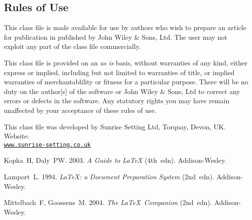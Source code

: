 \documentclass[times]{stvrauth}
\begin{document}
\subsection{Rules of Use}
This class file is made available for use by authors who wish to
prepare an article for publication in \emph{\journalnamelc}
published by John Wiley \& Sons, Ltd. The user may not exploit any
part of the class file commercially.

This class file is provided on an \emph{as is}  basis, without
warranties of any kind, either express or implied, including but
not limited to warranties of title, or implied  warranties of
merchantablility or fitness for a particular purpose. There will
be no duty on the author[s] of the software or  John Wiley \&
Sons, Ltd to correct any errors or defects in the software. Any
statutory  rights you may have remain unaffected by your
acceptance of these rules of use.

\ack This class file was developed by Sunrise Setting Ltd,
Torquay, Devon, UK. Website:\\
\href{http://www.sunrise-setting.co.uk}{\texttt{www.sunrise-setting.co.uk}}

\begin{thebibliography}{9}

 Kopka~H, Daly~PW. 2003. \emph{A Guide to \LaTeX} (4th~edn).
Addison-Wesley.

 Lamport~L. 1994. \emph{\LaTeX: a Document Preparation System} (2nd~edn).
Addison-Wesley.

 Mittelbach~F, Goossens~M. 2004. \emph{The \LaTeX\ Companion}
(2nd~edn). Addison-Wesley.
\end{thebibliography}
\end{document}
